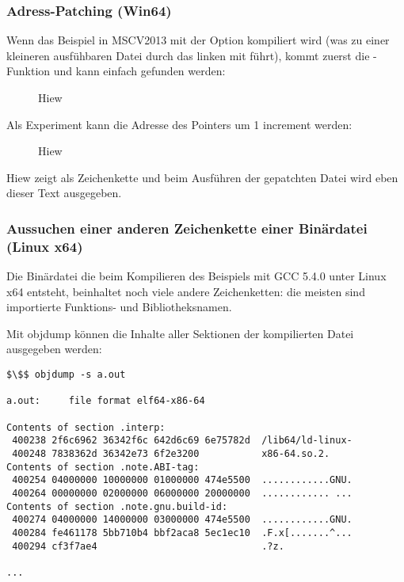 \subsubsection{Adress-Patching (Win64)}

Wenn das Beispiel in MSCV2013 mit der Option  kompiliert wird
(was zu einer kleineren ausfühbaren Datei durch das linken mit  führt),
kommt zuerst die \main-Funktion und kann einfach gefunden werden:

\begin{figure}[H]
\centering
{}
\caption{Hiew}
\label{}
\end{figure}

Als Experiment kann die Adresse des Pointers um 1 \gls{increment} werden:

\begin{figure}[H]
\centering
{}
\caption{Hiew}
\label{}
\end{figure}

Hiew zeigt  als Zeichenkette und beim Ausführen der gepatchten
Datei wird eben dieser Text ausgegeben.

\subsubsection{Aussuchen einer anderen Zeichenkette einer Binärdatei (Linux x64)}

Die Binärdatei die beim Kompilieren des Beispiels mit GCC 5.4.0 unter Linux x64
entsteht, beinhaltet noch viele andere Zeichenketten: die meisten sind importierte
Funktions- und Bibliotheksnamen.

Mit objdump können die Inhalte aller Sektionen der kompilierten Datei ausgegeben werden:

\begin{lstlisting}[basicstyle=\ttfamily, mathescape]
$\$$ objdump -s a.out

a.out:     file format elf64-x86-64

Contents of section .interp:
 400238 2f6c6962 36342f6c 642d6c69 6e75782d  /lib64/ld-linux-
 400248 7838362d 36342e73 6f2e3200           x86-64.so.2.
Contents of section .note.ABI-tag:
 400254 04000000 10000000 01000000 474e5500  ............GNU.
 400264 00000000 02000000 06000000 20000000  ............ ...
Contents of section .note.gnu.build-id:
 400274 04000000 14000000 03000000 474e5500  ............GNU.
 400284 fe461178 5bb710b4 bbf2aca8 5ec1ec10  .F.x[.......^...
 400294 cf3f7ae4                             .?z.

...
\end{lstlisting}

